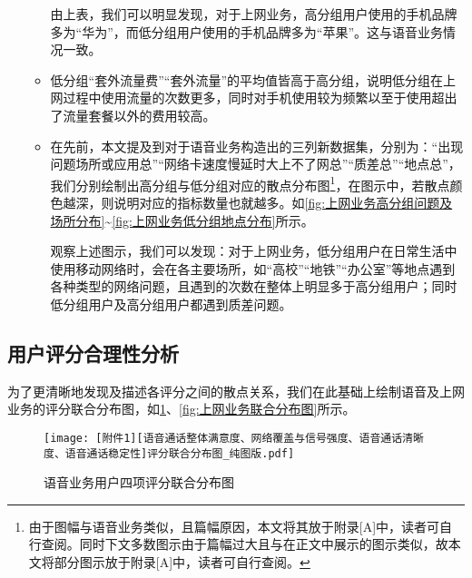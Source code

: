 \documentclass{MathorCupmodeling}
\begin{document}
\begin{itemize}
\begin{itemize}
\begin{table}[H]
			\caption{上网业务各手机品牌用户占比}
			\label{tab:上网业务各手机品牌用户占比}
		\end{table}
		由上表，我们可以明显发现，对于上网业务，高分组用户使用的手机品牌多为“华为”，而低分组用户使用的手机品牌多为“苹果”。这与语音业务情况一致。
		\item 低分组“套外流量费”“套外流量”的平均值皆高于高分组，说明低分组在上网过程中使用流量的次数更多，同时对手机使用较为频繁以至于使用超出了流量套餐以外的费用较高。
		\item 在先前，本文提及到对于语音业务构造出的三列新数据集，分别为：“出现问题场所或应用总”“网络卡速度慢延时大上不了网总”“质差总”“地点总”，我们分别绘制出高分组与低分组对应的散点分布图\textcolor{blue}{\footnote{由于图幅与语音业务类似，且篇幅原因，本文将其放于附录[A]中，读者可自行查阅。同时下文多数图示由于篇幅过大且与在正文中展示的图示类似，故本文将部分图示放于附录[A]中，读者可自行查阅。}}，在图示中，若散点颜色越深，则说明对应的指标数量也就越多。如\textcolor{blue}{\cref{fig:上网业务高分组问题及场所分布}}\textasciitilde\textcolor{blue}{\cref{fig:上网业务低分组地点分布}}所示。
		
		观察上述图示，我们可以发现：对于上网业务，低分组用户在日常生活中使用移动网络时，会在各主要场所，如“高校”“地铁”“办公室”等地点遇到各种类型的网络问题，且遇到的次数在整体上明显多于高分组用户；同时低分组用户及高分组用户都遇到质差问题。
	\end{itemize}
	\end{itemize}
	
	\subsection{用户评分合理性分析}
	
	为了更清晰地发现及描述各评分之间的散点关系，我们在此基础上绘制语音及上网业务的评分联合分布图，如\textcolor{blue}{\cref{fig:语音业务联合分布图}}、\textcolor{blue}{\cref{fig:上网业务联合分布图}}所示。
	\begin{figure}[H]
		\centering
			\centering
			\texttt{[image: [附件1][语音通话整体满意度、网络覆盖与信号强度、语音通话清晰度、语音通话稳定性]评分联合分布图\_纯图版.pdf]}
			\caption{语音业务用户四项评分联合分布图}
			\label{fig:语音业务联合分布图}
	\end{figure}
\end{document}
